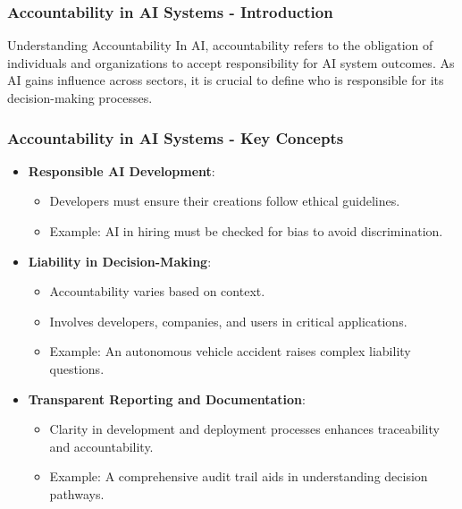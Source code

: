 \documentclass[aspectratio=169]{beamer}
\begin{document}
\begin{frame}[fragile]
    \frametitle{Accountability in AI Systems - Introduction}
    \begin{block}{Understanding Accountability}
        In AI, accountability refers to the obligation of individuals and organizations 
        to accept responsibility for AI system outcomes. As AI gains influence across sectors, 
        it is crucial to define who is responsible for its decision-making processes.
    \end{block}
\end{frame}

\begin{frame}[fragile]
    \frametitle{Accountability in AI Systems - Key Concepts}
    \begin{itemize}
        \item \textbf{Responsible AI Development}:
            \begin{itemize}
                \item Developers must ensure their creations follow ethical guidelines.
                \item Example: AI in hiring must be checked for bias to avoid discrimination.
            \end{itemize}

        \item \textbf{Liability in Decision-Making}:
            \begin{itemize}
                \item Accountability varies based on context.
                \item Involves developers, companies, and users in critical applications.
                \item Example: An autonomous vehicle accident raises complex liability questions.
            \end{itemize}

        \item \textbf{Transparent Reporting and Documentation}:
            \begin{itemize}
                \item Clarity in development and deployment processes enhances traceability and accountability.
                \item Example: A comprehensive audit trail aids in understanding decision pathways.
            \end{itemize}
    \end{itemize}
\end{frame}
\end{document}
